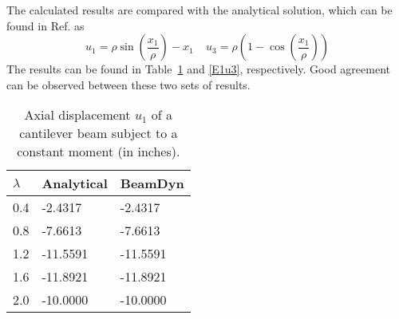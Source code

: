 The calculated results are compared with the analytical solution, which can be found in Ref.\cite{Mayo-etal:2004} as
\begin{equation}
    \label{E1Analytical}
    u_1 = \rho \sin \left( \frac{x_1}{\rho} \right) - x_1~~~~~u_3 = \rho
\left(1-\cos\left(\frac{x_1}{\rho}\right) \right)
\end{equation}
The results can be found in Table~\ref{E1u1} and \ref{E1u3}, respectively. Good agreement can be observed between these two sets of results.
\begin{table}[tbp]
\centering 
\caption{Axial displacement $u_1$ of a cantilever beam subject to a constant moment (in inches).}
\label{E1u1} 
	\begin{tabular}{| l | l | l | }
    	\hline
    	$\lambda$ & Analytical & BeamDyn  \\ \hline
    	0.4       & -2.4317    & -2.4317  \\ \hline
    	0.8       & -7.6613    & -7.6613  \\ \hline
    	1.2       & -11.5591   & -11.5591 \\ \hline
    	1.6       & -11.8921   & -11.8921 \\ \hline
    	2.0       & -10.0000   & -10.0000 \\ \hline
    \end{tabular}
\end{table}

